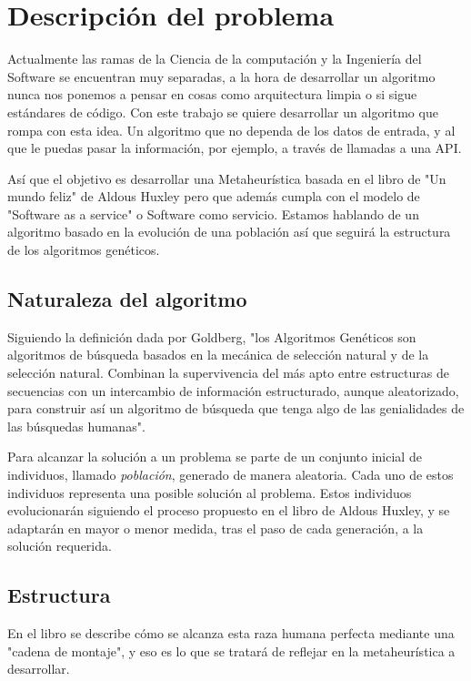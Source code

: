 \chapter{Descripción del problema}

Actualmente las ramas de la Ciencia de la computación y la Ingeniería del Software se encuentran muy separadas, a la
hora de desarrollar un algoritmo nunca nos ponemos a pensar en cosas como arquitectura limpia o si sigue estándares
de código. Con este trabajo se quiere desarrollar un algoritmo que rompa con esta idea. Un algoritmo que no dependa
de los datos de entrada, y al que le puedas pasar la información, por ejemplo, a través de llamadas a una API.

Así que el objetivo es desarrollar una Metaheurística basada en el libro de "Un mundo feliz" de Aldous
Huxley pero que además cumpla con el modelo de "Software as a service" o Software como servicio. Estamos hablando de
un algoritmo basado en la evolución de una población así que seguirá la estructura de los algoritmos genéticos.


\section{Naturaleza del algoritmo}

Siguiendo la definición dada por Goldberg, "los Algoritmos Genéticos son algoritmos de búsqueda basados en la
mecánica de selección natural y de la selección natural. Combinan la supervivencia del más apto entre estructuras
de secuencias con un intercambio de información estructurado, aunque aleatorizado, para construir así un algoritmo
de búsqueda que tenga algo de las genialidades de las búsquedas humanas"\cite{goldberg89}.

Para alcanzar la solución a un problema se parte de un conjunto inicial de individuos, llamado \textit{población},
generado de manera aleatoria. Cada uno de estos individuos representa una posible solución al problema. Estos individuos
evolucionarán siguiendo el proceso propuesto en el libro de Aldous Huxley, y se adaptarán en mayor o menor medida,
tras el paso de cada generación, a la solución requerida.



\section{Estructura}

En el libro se describe cómo se alcanza esta raza humana perfecta mediante una "cadena de montaje", y eso es lo que se
tratará de reflejar en la metaheurística a desarrollar.

